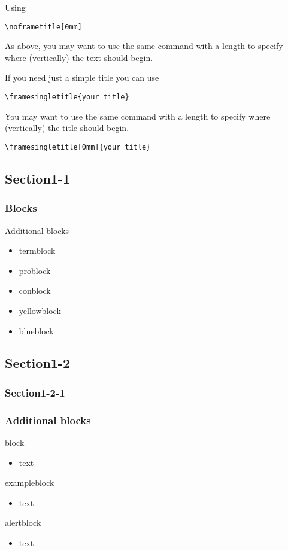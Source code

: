 \documentclass[slidestop,compress,9pt,aspectratio=43]{beamer}
\begin{document}
\begin{frame}[fragile]
\noframetitle[0mm]
Using 
\begin{lstlisting}
\noframetitle[0mm]
\end{lstlisting}

\vskip 10mm
As above, you may want to use the same command with a length to specify where (vertically) the text should begin.
\end{frame}

\begin{frame}[fragile]
If you need just a simple title you can use
\begin{lstlisting}
\framesingletitle{your title}
\end{lstlisting}

\vskip 10mm
You may want to use the same command with a length to specify where (vertically) the title should begin.
\begin{lstlisting}
\framesingletitle[0mm]{your title}
\end{lstlisting}
\end{frame}

\subsection{Section1-1}
\begin{frame}
\frametitle{Blocks}
Additional blocks
\begin{itemize}
  \item termblock
  \item problock
  \item conblock
  \item yellowblock
  \item blueblock
\end{itemize}
\end{frame}

\subsection{Section1-2}
\subsubsection{Section1-2-1}
\begin{frame}
\frametitle{Additional blocks}
\begin{block}{block}
\begin{itemize} \item text \end{itemize}
\end{block}
\begin{exampleblock}{exampleblock}
\begin{itemize} \item text \end{itemize}
\end{exampleblock}
\begin{alertblock}{alertblock}
\begin{itemize} \item text \end{itemize}
\end{alertblock}
\end{frame}
\end{document}
